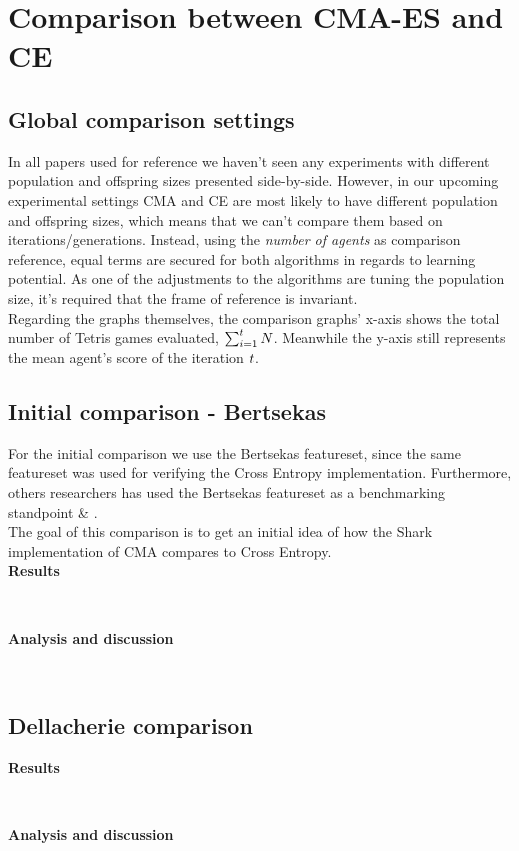 \section{Comparison between CMA-ES and CE}

\subsection{Global comparison settings}
In all papers used for reference we haven't seen any experiments with different population
and offspring sizes presented side-by-side. However, in our upcoming experimental settings
CMA and CE are most likely to have different population and offspring sizes, which means
that we can't compare them based on iterations/generations. Instead, using the  
\textit{number of agents} as comparison reference, equal terms are secured for both algorithms 
in regards to learning potential. As one of the adjustments to the algorithms are tuning the 
population size, it's required that the frame of reference is invariant.\\
Regarding the graphs themselves, the comparison graphs' x-axis shows the total number 
of Tetris games evaluated, $\sum_{i = 1}^{t} N$. Meanwhile
the y-axis still represents the mean agent's score of the iteration $t$.

\subsection{Initial comparison - Bertsekas}
For the initial comparison we use the Bertsekas featureset, since the same featureset
was used for verifying the Cross Entropy implementation. Furthermore, others researchers
has used the Bertsekas featureset as a benchmarking standpoint \citep{thiery:09} \&
\citep{szita:06}.\\
The goal of this comparison is to get an initial idea of how the Shark implementation of
CMA compares to Cross Entropy.\\

\textbf{Results}

\\


\textbf{Analysis and discussion}

\\


\subsection{Dellacherie comparison}


\textbf{Results}

\\


\textbf{Analysis and discussion}

\\
